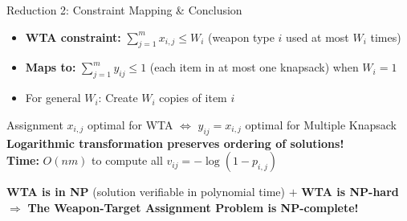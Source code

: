 \documentclass[aspectratio=169,10pt]{beamer}
\begin{document}
\begin{frame}{Reduction 2: Constraint Mapping \& Conclusion}


  \vspace{0.15cm}
  {\footnotesize
  \begin{itemize}
    \setlength\itemsep{3pt}
    \item[\color{goldaccent}$\blacktriangleright$]
      \textbf{WTA constraint:} $\sum_{j=1}^{m} x_{i,j} \leq W_i$ (weapon type $i$ used at most $W_i$ times)
    \item[\color{goldaccent}$\blacktriangleright$]
      \textbf{Maps to:} $\sum_{j=1}^{m} y_{ij} \leq 1$ (each item in at most one knapsack) when $W_i = 1$
    \item[\color{goldaccent}$\blacktriangleright$]
      For general $W_i$: Create $W_i$ copies of item $i$
  \end{itemize}
  }

  \vspace{0.25cm}


  \vspace{0.15cm}
  {\footnotesize
  Assignment $x_{i,j}$ optimal for WTA $\Leftrightarrow$ $y_{ij} = x_{i,j}$ optimal for Multiple Knapsack\\
  \textbf{Logarithmic transformation preserves ordering of solutions!}\\
  \textbf{Time:} $O(nm)$ to compute all $v_{ij} = -\log(1-p_{i,j})$
  }

  \vspace{0.25cm}


  \vspace{0.15cm}
  \begin{center}
  {\footnotesize
  \textbf{WTA is in NP} (solution verifiable in polynomial time) $+$ \textbf{WTA is NP-hard}\\[4pt]
  {\color{goldaccent}$\Rightarrow$} \textbf{The Weapon-Target Assignment Problem is NP-complete!}
  }
  \end{center}

\end{frame}
\end{document}
